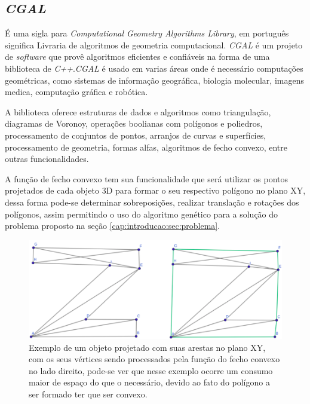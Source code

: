 \subsection{\textit{CGAL}}

\cite{cgal:software} É uma sigla para \textit{Computational Geometry Algorithms Library}, em português significa Livraria de algoritmos de geometria computacional.\newline
\cite{cgal:complete_manual}\textit{CGAL} é um projeto de \textit{software} que provê algoritmos eficientes e confiáveis na forma de uma biblioteca de \textit{C++}.\textit{CGAL} é usado em varias áreas onde é necessário computações geométricas, como sistemas de informação geográfica, biologia molecular, imagens medica, computação gráfica e robótica.\newline

A biblioteca oferece estruturas de dados e algoritmos como triangulação, diagramas de Voronoy, operações boolianas com polígonos e poliedros, processamento de conjuntos de pontos, arranjos de curvas e superfícies, processamento de geometria, formas alfas, algoritmos de fecho convexo, entre outras funcionalidades. \newline

\cite{cgal:convex_hull}A função de fecho convexo tem sua funcionalidade que será utilizar os pontos projetados de cada objeto 3D para formar o seu respectivo polígono no plano XY, dessa forma pode-se determinar sobreposições, realizar translação e rotações dos polígonos, assim permitindo o uso do algoritmo genético para a solução do problema proposto na seção \ref{cap:introducao:sec:problema}.

\begin{figure}[H]
    \centering
    \includegraphics[scale=0.4]{Capitulos/Cap02_figs/CGAL_Convex_EX.png}
    \caption{Exemplo de um objeto projetado com suas arestas no plano XY, com os seus vértices sendo processados pela função do fecho convexo no lado direito, pode-se ver que nesse exemplo ocorre um consumo maior de espaço do que o necessário, devido ao fato do polígono a ser formado ter que ser convexo.}
    \label{fig:Cap02_CGAL_Convex_EX}
\end{figure}


